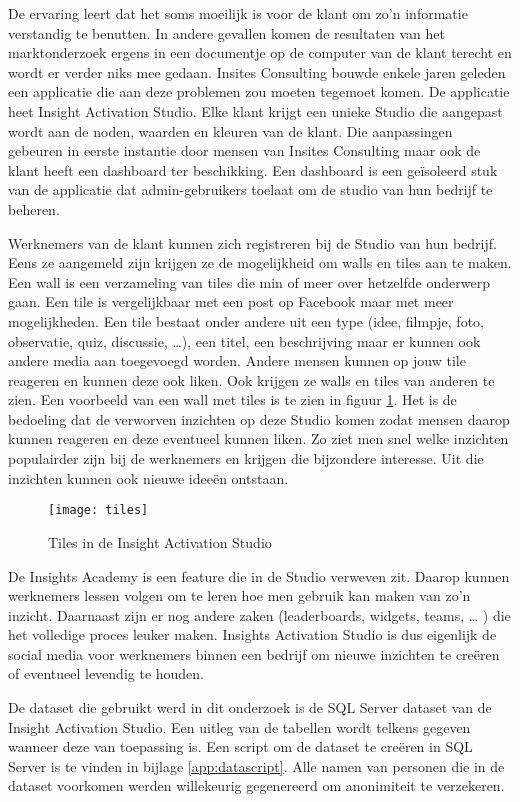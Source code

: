De ervaring leert dat het soms moeilijk is voor de klant om zo'n informatie verstandig te benutten. In andere gevallen komen de resultaten van het marktonderzoek ergens in een documentje op de computer van de klant terecht en wordt er verder niks mee gedaan. Insites Consulting bouwde enkele jaren geleden een applicatie die aan deze problemen zou moeten tegemoet komen. De applicatie heet Insight Activation Studio. Elke klant krijgt een unieke Studio die aangepast wordt aan de noden, waarden en kleuren van de klant. Die aanpassingen gebeuren in eerste instantie door mensen van Insites Consulting maar ook de klant heeft een dashboard ter beschikking. Een dashboard is een geïsoleerd stuk van de applicatie dat admin-gebruikers toelaat om de studio van hun bedrijf te beheren.  

Werknemers van de klant kunnen zich registreren bij de Studio van hun bedrijf. Eens ze aangemeld zijn krijgen ze de mogelijkheid om walls en tiles aan te maken. Een wall is een verzameling van tiles die min of meer over hetzelfde onderwerp gaan. Een tile is vergelijkbaar met een post op Facebook maar met meer mogelijkheden. Een tile bestaat onder andere uit een type (idee, filmpje, foto, observatie, quiz, discussie, …), een titel, een beschrijving maar er kunnen ook andere media aan toegevoegd worden. Andere mensen kunnen op jouw tile reageren en kunnen deze ook liken. Ook krijgen ze walls en tiles van anderen te zien. Een voorbeeld van een wall met tiles is te zien in figuur \ref{fig:tiles}. Het is de bedoeling dat de verworven inzichten op deze Studio komen zodat mensen daarop kunnen reageren en deze eventueel kunnen liken. Zo ziet men snel welke inzichten populairder zijn bij de werknemers en krijgen die bijzondere interesse. Uit die inzichten kunnen ook nieuwe ideeën ontstaan.

\begin{figure}
	\centering
	\texttt{[image: tiles]}
	\caption{Tiles in de Insight Activation Studio}
	\label{fig:tiles}
\end{figure}

De Insights Academy is een feature die in de Studio verweven zit. Daarop kunnen werknemers lessen volgen om te leren hoe men gebruik kan maken van zo’n inzicht. Daarnaast zijn er nog andere zaken (leaderboards, widgets, teams, … ) die het volledige proces leuker maken. Insights Activation Studio is dus eigenlijk de social media voor werknemers binnen een bedrijf om nieuwe inzichten te creëren of eventueel levendig te houden.

De dataset die gebruikt werd in dit onderzoek is de SQL Server dataset van de Insight Activation Studio. Een uitleg van de tabellen wordt telkens gegeven wanneer deze van toepassing is. Een script om de dataset te creëren in SQL Server is te vinden in bijlage \ref{app:datascript}. Alle namen van personen die in de dataset voorkomen werden willekeurig gegenereerd om anonimiteit te verzekeren.

